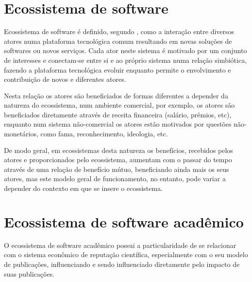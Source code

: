 \section{Ecossistema de software}


Ecossistema de software é definido, segundo ,
como a interação entre diversos atores numa plataforma tecnológica comum
resultando em novas soluções de softwares ou novos serviços. Cada ator neste
sistema é motivado por um conjunto de interesses e conectam-se entre si e ao
próprio sistema numa relação simbiótica, fazendo a plataforma tecnológica
evoluir enquanto permite o envolvimento e contribuição de novos e diferentes
atores.

Nesta relação os atores são beneficiados de formas diferentes a depender da
natureza do ecossistema, num ambiente comercial, por exemplo, os atores são
beneficiados diretamente através de receita financeira (salário, prêmios, etc),
enquanto num sistema não-comercial os atores estão motivados por questões
não-monetários, como fama, reconhecimento, ideologia, etc.

De modo geral, em ecossistemas desta natureza os benefícios, recebidos pelos
atores e proporcionados pelo ecossistema, aumentam com o passar do tempo
através de uma relação de benefício mútuo, beneficiando ainda mais os seus atores,
mas este modelo geral de
funcionamento, no entanto, pode variar a depender do contexto em que se insere
o ecossistema.



\section{Ecossistema de software acadêmico}

O ecossistema de software acadêmico possui a particularidade de se relacionar
com o sistema econômico de reputação científica, especialmente com o seu modelo
de publicações, influenciando e sendo influenciado diretamente pelo impacto de
suas publicações.


